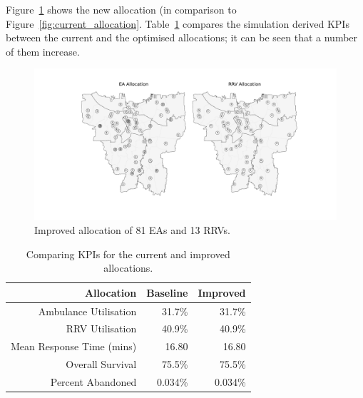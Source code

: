 \documentclass[preprint,12pt]{elsarticle}
\begin{document}
Figure~\ref{fig:optimal_current_allocation} shows the new allocation (in
comparison to Figure~\ref{fig:current_allocation}.
Table~\ref{tbl:current_optimal_compare} compares the simulation derived KPIs
between the current and the optimised allocations; it can be seen that a
number of them increase.

\begin{figure}
\begin{center}
\includegraphics[width=\textwidth]{img/map_current}
\caption{Improved allocation of 81 EAs and 13 RRVs.}
\label{fig:optimal_current_allocation}
\end{center}
\end{figure}

\begin{table}
\begin{center}
\begin{tabular}{rrr}
\toprule
Allocation & Baseline & Improved \\
\midrule
Ambulance Utilisation & 31.7\% & 31.7\% \\
RRV Utilisation & 40.9\% & 40.9\% \\
Mean Response Time (mins) & 16.80 & 16.80 \\
Overall Survival & 75.5\% & 75.5\% \\
Percent Abandoned & 0.034\% & 0.034\% \\
\bottomrule
\end{tabular}
\caption{Comparing KPIs for the current and improved allocations.}
\label{tbl:current_optimal_compare}
\end{center}
\end{table}
\end{document}
